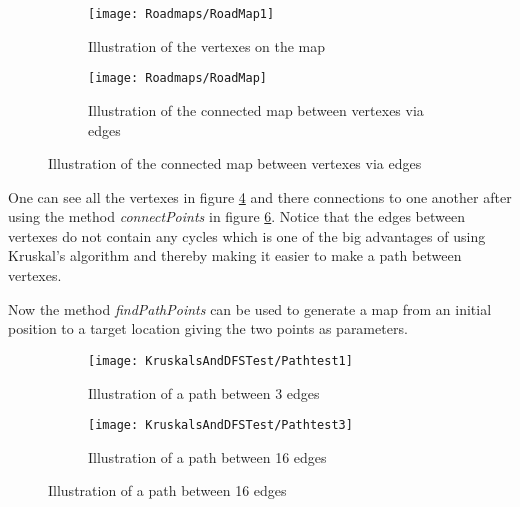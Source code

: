 \documentclass[../Head/Main.tex]{subfiles}
\begin{document}
  \begin{figure}[H]
   \begin{subfigure}[b]{0.49\textwidth}
    \centering
    \texttt{[image: Roadmaps/RoadMap1]}
    \caption{Illustration of the vertexes on the map}
    \label{fig:Vertexes}
  \end{subfigure}
  \hfill
   \begin{subfigure}[b]{0.49\textwidth}
    \centering
    \texttt{[image: Roadmaps/RoadMap]}
    \caption{Illustration of the connected map between vertexes via edges}
    \label{fig:VertexesAndEdges}
  \end{subfigure}
  \end{figure}  
  
One can see all the vertexes in figure \ref{fig:Vertexes} and there connections to one another after using the method \textit{connectPoints} in figure \ref{fig:VertexesAndEdges}. Notice that the edges between vertexes do not contain any cycles which is one of the big advantages of using Kruskal's algorithm and thereby making it easier to make a path between vertexes.  

Now the method \textit{findPathPoints} can be used to generate a map from an initial position to a target location giving the two points as parameters.   

  \begin{figure}[H]
   \begin{subfigure}[b]{0.49\textwidth}
    \centering
    \texttt{[image: KruskalsAndDFSTest/Pathtest1]}
    \caption{Illustration of a path between 3 edges}
    \label{fig:Vertexes}
  \end{subfigure}
  \hfill
   \begin{subfigure}[b]{0.49\textwidth}
    \centering
    \texttt{[image: KruskalsAndDFSTest/Pathtest3]}
    \caption{Illustration of a path between 16 edges}
    \label{fig:VertexesAndEdges}
  \end{subfigure}
  \end{figure}  

    
\end{document}

